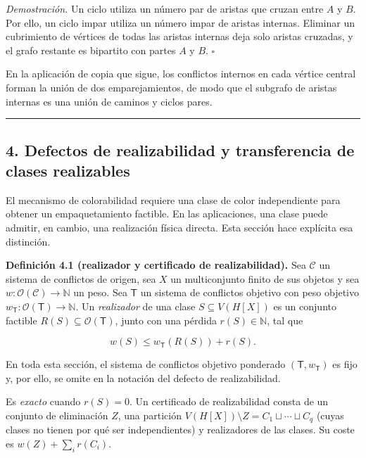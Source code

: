 \documentclass[spanish,11pt,a4paper]{article}
\begin{document}
\emph{Demostración.} Un ciclo utiliza un número par de aristas que
cruzan entre \(A\) y \(B\). Por ello, un ciclo impar utiliza un número
impar de aristas internas. Eliminar un cubrimiento de vértices de todas
las aristas internas deja solo aristas cruzadas, y el grafo restante es
bipartito con partes \(A\) y \(B\). \(\square\)

En la aplicación de copia que sigue, los conflictos internos en cada
vértice central forman la unión de dos emparejamientos, de modo que el
subgrafo de aristas internas es una unión de caminos y ciclos pares.

\begin{center}\rule{0.5\linewidth}{0.5pt}\end{center}

\subsection{4. Defectos de realizabilidad y transferencia de clases
realizables}\label{defectos-de-realizabilidad-y-transferencia-de-clases-realizables}

El mecanismo de colorabilidad requiere una clase de color independiente
para obtener un empaquetamiento factible. En las aplicaciones, una clase
puede admitir, en cambio, una realización física directa. Esta sección
hace explícita esa distinción.

\textbf{Definición 4.1 (realizador y certificado de realizabilidad).}
Sea \(\mathcal C\) un sistema de conflictos de origen, sea \(X\) un
multiconjunto finito de sus objetos y sea
\(w:\mathcal O(\mathcal C)\to\mathbb N\) un peso. Sea \(\mathsf T\) un
sistema de conflictos objetivo con peso objetivo
\(w_{\mathsf T}:\mathcal O(\mathsf T)\to\mathbb N\). Un
\emph{realizador} de una clase \(S\subseteq V(H[X])\) es un conjunto
factible \(R(S)\subseteq\mathcal O(\mathsf T)\), junto con una pérdida
\(r(S)\in\mathbb N\), tal que

\[
w(S)\le w_{\mathsf T}(R(S))+r(S).
\]

En toda esta sección, el sistema de conflictos objetivo ponderado
\((\mathsf T,w_{\mathsf T})\) es fijo y, por ello, se omite en la
notación del defecto de realizabilidad.

Es \emph{exacto} cuando \(r(S)=0\). Un certificado de realizabilidad
consta de un conjunto de eliminación \(Z\), una partición
\(V(H[X])\setminus Z=C_1\sqcup\cdots\sqcup C_q\) (cuyas clases no tienen
por qué ser independientes) y realizadores de las clases. Su coste es
\(w(Z)+\sum_i r(C_i)\).
\end{document}

